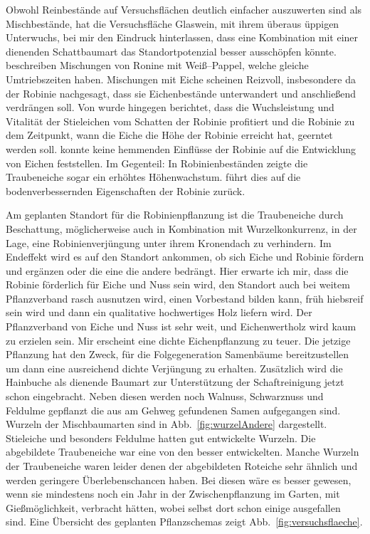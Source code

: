\documentclass[twocolumn]{scrartcl}
\begin{document}
Obwohl Reinbestände auf Versuchsflächen deutlich einfacher auszuwerten sind als Mischbestände,
hat die Versuchsfläche Glaswein, mit ihrem überaus üppigen Unterwuchs, bei mir den Eindruck hinterlassen,
dass eine Kombination mit einer dienenden Schattbaumart das Standortpotenzial besser ausschöpfen könnte.
\cite{redei2006robiniePappel}
beschreiben Mischungen von Ronine mit Weiß--Pappel, welche gleiche
Umtriebszeiten haben. Mischungen mit Eiche scheinen Reizvoll,
insbesondere da der Robinie nachgesagt, dass sie Eichenbestände
unterwandert und anschließend verdrängen soll. Von \cite{kallina1888robinie} wurde
hingegen berichtet, dass die Wuchsleistung und Vitalität der
Stieleichen vom Schatten der Robinie profitiert und die Robinie zu dem
Zeitpunkt, wann die Eiche die Höhe der Robinie erreicht hat, geerntet
werden soll. \cite{feher2024robinie} konnte keine hemmenden Einflüsse
der Robinie auf die Entwicklung von Eichen feststellen. Im Gegenteil:
In Robinienbeständen zeigte die Traubeneiche sogar ein erhöhtes
Höhenwachstum. \cite{foeldes1903robinie} führt dies auf die
bodenverbessernden Eigenschaften der Robinie zurück.

Am geplanten Standort für die Robinienpflanzung ist die Traubeneiche durch Beschattung,
möglicherweise auch in Kombination mit Wurzelkonkurrenz, in der Lage, eine Robinienverjüngung unter ihrem Kronendach zu verhindern.
Im Endeffekt wird es auf
den Standort ankommen, ob sich Eiche und Robinie fördern und ergänzen
oder die eine die andere bedrängt. Hier erwarte ich mir, dass die
Robinie förderlich für Eiche und Nuss sein wird, den Standort auch bei
weitem Pflanzverband rasch ausnutzen wird, einen Vorbestand bilden
kann, früh hiebsreif sein wird und dann ein qualitative hochwertiges
Holz liefern wird. Der Pflanzverband von Eiche und Nuss ist
sehr weit, und Eichenwertholz wird kaum zu erzielen sein. Mir
erscheint eine dichte Eichenpflanzung zu teuer. Die jetzige Pflanzung
hat den Zweck, für die Folgegeneration Samenbäume bereitzustellen um
dann eine ausreichend dichte Verjüngung zu erhalten. Zusätzlich wird
die Hainbuche als dienende Baumart zur Unterstützung der
Schaftreinigung jetzt schon eingebracht. Neben diesen werden noch
Walnuss, Schwarznuss und Feldulme gepflanzt die aus am Gehweg gefundenen
Samen aufgegangen sind. Wurzeln der Mischbaumarten sind in
Abb.~\ref{fig:wurzelAndere} dargestellt. Stieleiche und besonders Feldulme
hatten gut entwickelte Wurzeln. Die abgebildete Traubeneiche war eine
von den besser entwickelten. Manche Wurzeln der Traubeneiche waren leider denen der abgebildeten
Roteiche sehr ähnlich und werden geringere Überlebenschancen haben. Bei diesen wäre es besser gewesen, wenn sie mindestens
noch ein Jahr in der Zwischenpflanzung im Garten, mit Gießmöglichkeit,
verbracht hätten, wobei selbst dort schon einige ausgefallen
sind. Eine Übersicht des geplanten Pflanzschemas zeigt
Abb.~\ref{fig:versuchsflaeche}.
\end{document}
